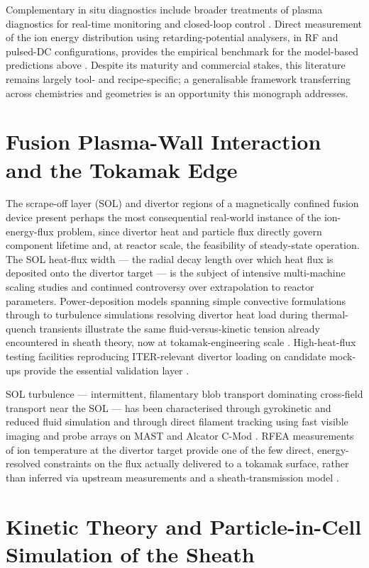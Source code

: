 Complementary in situ diagnostics include broader treatments of plasma diagnostics for real-time monitoring and closed-loop control \cite{ref0553}. Direct measurement of the ion energy distribution using retarding-potential analysers, in RF and pulsed-DC configurations, provides the empirical benchmark for the model-based predictions above \cite{ref0540}. Despite its maturity and commercial stakes, this literature remains largely tool- and recipe-specific; a generalisable framework transferring across chemistries and geometries is an opportunity this monograph addresses.

\section{Fusion Plasma-Wall Interaction and the Tokamak Edge}

The scrape-off layer (SOL) and divertor regions of a magnetically confined fusion device present perhaps the most consequential real-world instance of the ion-energy-flux problem, since divertor heat and particle flux directly govern component lifetime and, at reactor scale, the feasibility of steady-state operation. The SOL heat-flux width — the radial decay length over which heat flux is deposited onto the divertor target — is the subject of intensive multi-machine scaling studies and continued controversy over extrapolation to reactor parameters. Power-deposition models spanning simple convective formulations through to turbulence simulations resolving divertor heat load during thermal-quench transients illustrate the same fluid-versus-kinetic tension already encountered in sheath theory, now at tokamak-engineering scale \cite{ref0605}. High-heat-flux testing facilities reproducing ITER-relevant divertor loading on candidate mock-ups provide the essential validation layer \cite{ref0581}.

SOL turbulence — intermittent, filamentary blob transport dominating cross-field transport near the SOL — has been characterised through gyrokinetic and reduced fluid simulation \cite{ref0605} and through direct filament tracking using fast visible imaging and probe arrays on MAST and Alcator C-Mod \cite{ref0600}. RFEA measurements of ion temperature at the divertor target provide one of the few direct, energy-resolved constraints on the flux actually delivered to a tokamak surface, rather than inferred via upstream measurements and a sheath-transmission model \cite{ref0610}.

\section{Kinetic Theory and Particle-in-Cell Simulation of the Sheath}


